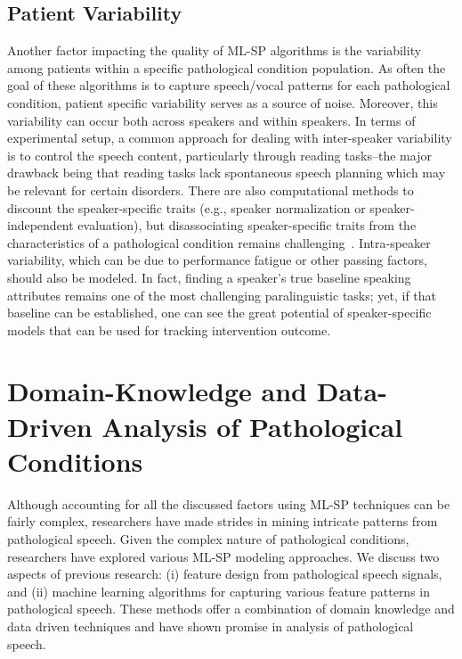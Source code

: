 \documentclass{article}
\begin{document}
\subsection{Patient Variability}
\label{sec:PatVar}
Another factor impacting the quality of ML-SP algorithms is the variability among patients within a specific pathological condition population. 
As often the goal of these algorithms is to capture speech/vocal patterns for each pathological condition, patient specific variability serves as a source of noise. Moreover, this variability can occur both across speakers and within speakers. In terms of experimental setup, a common approach for dealing with inter-speaker variability is to control the speech content, particularly through reading tasks--the major drawback being that reading tasks lack spontaneous speech planning which may be relevant for certain disorders.
There are also computational methods to discount the speaker-specific traits (e.g., speaker normalization or speaker-independent evaluation), but disassociating speaker-specific traits from the characteristics of a pathological condition remains challenging~\cite{berisha2013selecting}. Intra-speaker variability, which can be due to performance fatigue or other passing factors, should also be modeled. In fact, finding a speaker's true baseline speaking attributes remains one of the most challenging paralinguistic tasks; yet, if that baseline can be established, one can see the great potential of speaker-specific models that can be used for tracking intervention outcome.

\section{Domain-Knowledge and Data-Driven Analysis of Pathological Conditions} 
\label{sec:domainknowledgeDatadriven}

Although accounting for all the discussed factors using ML-SP techniques can be fairly complex, researchers have made strides in mining intricate patterns from pathological speech. Given the complex nature of pathological conditions, researchers have explored various ML-SP modeling approaches. We discuss two aspects of previous research: (i) feature design from pathological speech signals, and (ii) machine learning algorithms for capturing various feature patterns in pathological speech. These methods offer a combination of domain knowledge and data driven techniques and have shown promise in analysis of pathological speech.
 
\end{document}
